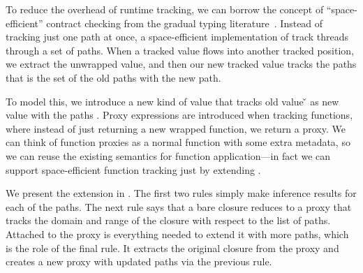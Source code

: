 \label{infer:sec:space-efficient-tracking}

To reduce the overhead of runtime tracking, we can borrow
the concept of ``space-efficient'' contract checking from
the gradual typing literature~.
%
Instead of tracking just one path at once, a space-efficient
implementation of track threads through a set of paths.
When a tracked value flows into another tracked position,
we extract the unwrapped value, and then our new tracked value
tracks the paths that is the set of the old paths with the new path.

To model this, we introduce a new kind of value \ProxyV{\v{}}{\closure{\e{}}{\openv{}}}{\ova{\inferpath{}}}
that tracks old value \v{} as new value \closure{\e{}}{\openv{}} with the paths \ova{\inferpath{}}.
Proxy expressions are introduced when tracking functions, where instead of just returning
a new wrapped function, we return a proxy.
We can think of function proxies as a normal function with some extra metadata, so we
can reuse the existing semantics for function application---in fact we
can support space-efficient function tracking just by extending \trackEOp{}.

We present the extension in .
The first two \trackEOp{} rules simply make inference
results for each of the paths.
The next rule says that a bare closure
reduces to a proxy that tracks the domain and range
of the closure with respect to the list of paths.
Attached to the proxy is everything needed to extend
it with more paths, which is the role of the
final rule. It extracts the original closure from the
proxy and creates a new proxy with updated paths
via the previous rule.


